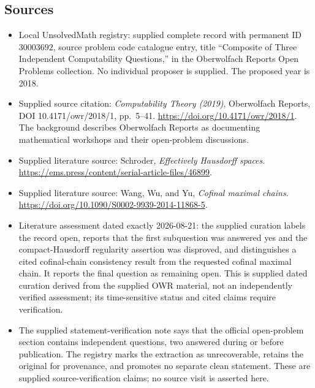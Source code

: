 \documentclass[11pt]{article}
\begin{document}
\subsection{Sources}
\begin{itemize}
\item Local UnsolvedMath registry: supplied complete record with permanent ID \(30003692\), source problem code catalogue entry, title ``Composite of Three Independent Computability Questions,'' in the Oberwolfach Reports Open Problems collection. No individual proposer is supplied. The proposed year is 2018.
\item Supplied source citation: \emph{Computability Theory (2019)}, Oberwolfach Reports, DOI 10.4171/owr/2018/1, pp.\ 5--41. \url{https://doi.org/10.4171/owr/2018/1}. The background describes Oberwolfach Reports as documenting mathematical workshops and their open-problem discussions.
\item Supplied literature source: Schroder, \emph{Effectively Hausdorff spaces}. \url{https://ems.press/content/serial-article-files/46899}.
\item Supplied literature source: Wang, Wu, and Yu, \emph{Cofinal maximal chains}. \url{https://doi.org/10.1090/S0002-9939-2014-11868-5}.
\item Literature assessment dated exactly 2026-08-21: the supplied curation labels the record open, reports that the first subquestion was answered yes and the compact-Hausdorff regularity assertion was disproved, and distinguishes a cited cofinal-chain consistency result from the requested cofinal maximal chain. It reports the final question as remaining open. This is supplied dated curation derived from the supplied OWR material, not an independently verified assessment; its time-sensitive status and cited claims require verification.
\item The supplied statement-verification note says that the official open-problem section contains independent questions, two answered during or before publication. The registry marks the extraction as unrecoverable, retains the original for provenance, and promotes no separate clean statement. These are supplied source-verification claims; no source visit is asserted here.
\end{itemize}
\end{document}
